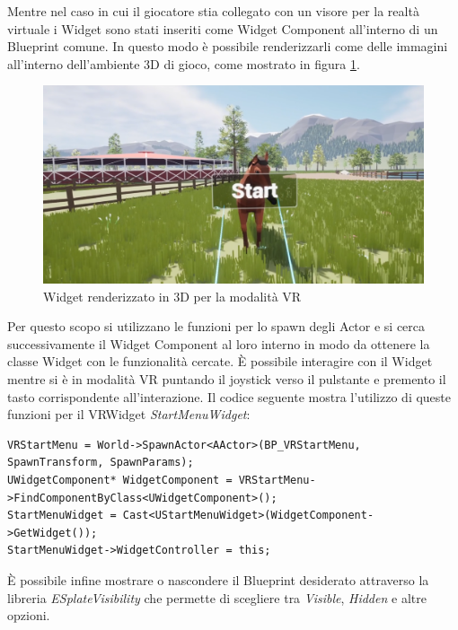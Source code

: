     Mentre nel caso in cui il giocatore stia collegato con un visore per la realtà virtuale i Widget sono stati inseriti come Widget Component all'interno di un Blueprint comune.
    In questo modo è possibile renderizzarli come delle immagini all'interno dell'ambiente 3D di gioco, come mostrato in figura \ref{img:WidgetVR}. 

    \begin{figure}[!t]\label{img:WidgetVR}
        \centering
        \includegraphics[width=12cm]{figure/StartMenuVRWidget2.png}
        \caption{Widget renderizzato in 3D per la modalità VR}
    \end{figure}

    Per questo scopo si utilizzano le funzioni per lo spawn degli Actor e si cerca successivamente il Widget Component al loro interno in modo da ottenere la classe Widget con le funzionalità cercate.
    È possibile interagire con il Widget mentre si è in modalità VR puntando il joystick verso il pulstante e premento il tasto corrispondente all'interazione.
    Il codice seguente mostra l'utilizzo di queste funzioni per il VRWidget \textit{StartMenuWidget}:

    \begin{lstlisting}[caption = Creazione Widget VR per la classe \textit{StartMenuWidget}]
VRStartMenu = World->SpawnActor<AActor>(BP_VRStartMenu, SpawnTransform, SpawnParams);
UWidgetComponent* WidgetComponent = VRStartMenu->FindComponentByClass<UWidgetComponent>();
StartMenuWidget = Cast<UStartMenuWidget>(WidgetComponent->GetWidget());
StartMenuWidget->WidgetController = this;
    \end{lstlisting}

    È possibile infine mostrare o nascondere il Blueprint desiderato attraverso la libreria \textit{ESplateVisibility} che permette di scegliere tra \textit{Visible}, \textit{Hidden} e altre opzioni.

